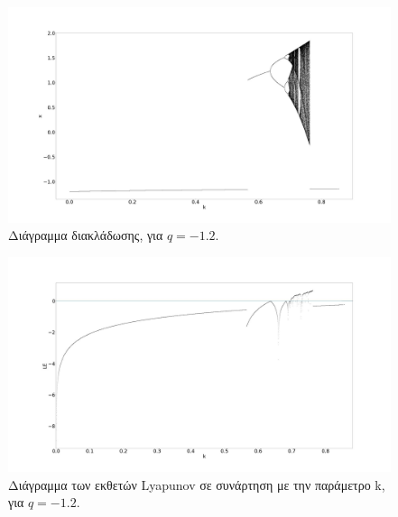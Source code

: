 \begin{figure}[ht]
	\centering
	\includegraphics[width=1\linewidth]{LateX images/graphs q12/g1}
	\caption{ Διάγραμμα διακλάδωσης, για $q=-1.2$.}
	\label{f:g16}
\end{figure}

\begin{figure}[ht]
	\centering
	\includegraphics[width=1\linewidth]{LateX images/graphs q12/g2}
	\caption{Διάγραμμα των εκθετών Lyapunov σε συνάρτηση με την παράμετρο k, για $q=-1.2$.}
	\label{f:g17}
\end{figure}


